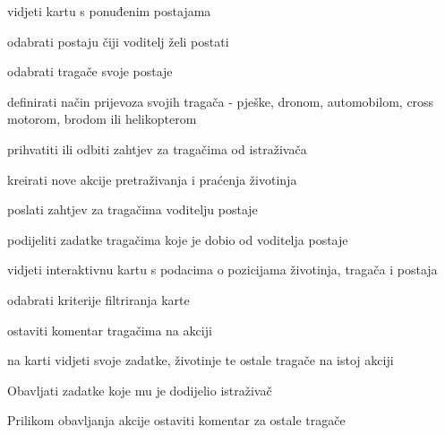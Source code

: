 			
			\begin{packed_enum}
				\item  {}
				
				\begin{packed_enum}
					
					\item vidjeti kartu s ponuđenim postajama
					\item odabrati postaju čiji voditelj želi postati
					\item odabrati tragače svoje postaje
					\item definirati način prijevoza svojih tragača - pješke, dronom, automobilom, cross motorom, brodom ili helikopterom
					\item prihvatiti ili odbiti zahtjev za tragačima od istraživača
					
				\end{packed_enum}
			
				\item  {}
				
				\begin{packed_enum}
					
					\item kreirati nove akcije pretraživanja i praćenja životinja
					\item poslati zahtjev za tragačima voditelju postaje
					\item podijeliti zadatke tragačima koje je dobio od voditelja postaje
					\item vidjeti interaktivnu kartu s podacima o pozicijama životinja, tragača i postaja
					\item odabrati kriterije filtriranja karte
					\item ostaviti komentar tragačima na akciji
					
				\end{packed_enum}
				
				\item  {}
				
				\begin{packed_enum}
					
					\item na karti vidjeti svoje zadatke, životinje te ostale tragače na istoj akciji
					\item Obavljati zadatke koje mu je dodijelio istraživač
					\item Prilikom obavljanja akcije ostaviti komentar za ostale tragače
					
				\end{packed_enum}
				
				
			\end{packed_enum}
			

